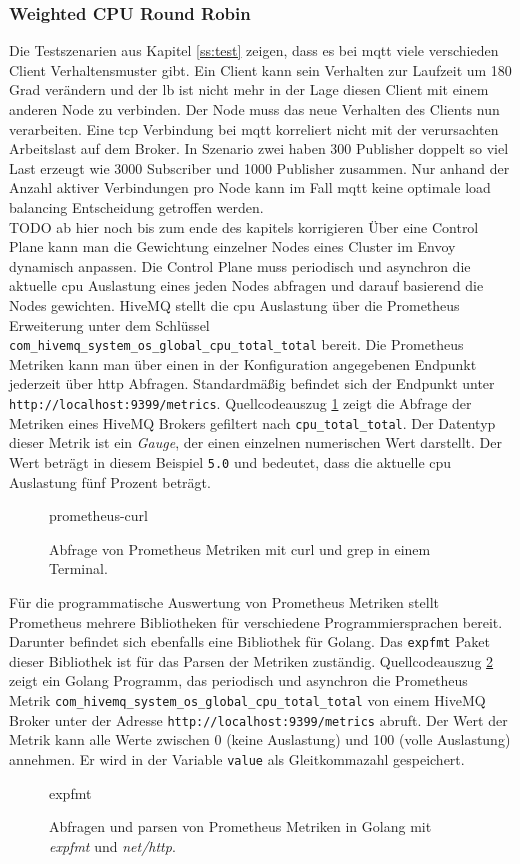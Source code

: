 \subsubsection{Weighted CPU Round Robin} \label{ss:weighted-cpu}
Die Testszenarien aus Kapitel \ref{ss:test} zeigen, dass es bei \ac{mqtt} viele verschieden Client Verhaltensmuster gibt. Ein Client kann sein Verhalten zur Laufzeit um 180 Grad verändern und der \acl{lb} ist nicht mehr in der Lage diesen Client mit einem anderen Node zu verbinden. Der Node muss das neue Verhalten des Clients nun verarbeiten.
Eine \ac{tcp} Verbindung bei \ac{mqtt} korreliert nicht mit der verursachten Arbeitslast auf dem Broker. In Szenario zwei haben 300 Publisher doppelt so viel Last erzeugt wie 3000 Subscriber und 1000 Publisher zusammen.
Nur anhand der Anzahl aktiver Verbindungen pro Node kann im Fall \ac{mqtt} keine optimale load balancing Entscheidung getroffen werden.
\\
TODO ab hier noch bis zum ende des kapitels korrigieren
Über eine Control Plane kann man die Gewichtung einzelner Nodes eines Cluster im Envoy dynamisch anpassen.
Die Control Plane muss periodisch und asynchron die aktuelle \ac{cpu} Auslastung eines jeden Nodes abfragen und darauf basierend die Nodes gewichten.
HiveMQ stellt die \ac{cpu} Auslastung über die Prometheus Erweiterung unter dem Schlüssel \verb|com_hivemq_system_os_global_cpu_total_total| bereit.
Die Prometheus Metriken kann man über einen in der Konfiguration angegebenen Endpunkt jederzeit über \ac{http} Abfragen. Standardmä{\ss}ig befindet sich der Endpunkt unter \verb|http://localhost:9399/metrics|.
Quellcodeauszug \ref{code:prometheus-curl} zeigt die Abfrage der Metriken eines HiveMQ Brokers gefiltert nach \verb|cpu_total_total|. Der Datentyp dieser Metrik ist ein \textit{Gauge}, der einen einzelnen numerischen Wert darstellt.\cite{prometheusMetricTypesPrometheus} Der Wert beträgt in diesem Beispiel \verb|5.0| und bedeutet, dass die aktuelle \ac{cpu} Auslastung fünf Prozent beträgt.
\begin{figure}
    {prometheus-curl}
    \caption{Abfrage von Prometheus Metriken mit curl und grep in einem Terminal.}
    \label{code:prometheus-curl}
\end{figure}
Für die programmatische Auswertung von Prometheus Metriken stellt Prometheus mehrere Bibliotheken für verschiedene Programmiersprachen bereit. Darunter befindet sich ebenfalls eine Bibliothek für Golang. Das \verb|expfmt| Paket dieser Bibliothek ist für das Parsen der Metriken zuständig.\cite{ExpfmtPkgGo}
Quellcodeauszug \ref{code:expfmt} zeigt ein Golang Programm, das periodisch und asynchron die Prometheus Metrik \verb|com_hivemq_system_os_global_cpu_total_total| von einem HiveMQ Broker unter der Adresse \verb|http://localhost:9399/metrics| abruft. Der Wert der Metrik kann alle Werte zwischen 0 (keine Auslastung) und 100 (volle Auslastung) annehmen. Er wird in der Variable \verb|value| als Gleitkommazahl gespeichert.
\begin{figure}
    {expfmt}
    \caption{Abfragen und parsen von Prometheus Metriken in Golang mit \textit{expfmt} und \textit{net/http}.}
    \label{code:expfmt}
\end{figure}
\\

